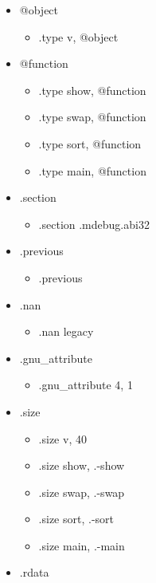 \documentclass[12pt]{article}
\begin{document}
\begin{itemize}
\item @object\\
  \begin{itemize}
  \item .type v, @object
  \end{itemize}
 \item @function\\
  \begin{itemize}
  \item .type show, @function
  \item .type swap, @function
  \item .type sort, @function
  \item .type main, @function
  \end{itemize}
\item .section\\
  \begin{itemize}
  \item .section .mdebug.abi32
  \end{itemize}
\item .previous\\
  \begin{itemize}
  \item .previous
  \end{itemize}
\item .nan\\
  \begin{itemize}
  \item .nan legacy
  \end{itemize}
\item .gnu\_attribute\\
  \begin{itemize}
  \item .gnu\_attribute 4, 1
  \end{itemize}
\item .size\\
  \begin{itemize}
  \item .size v, 40
  \item .size show, .-show
  \item .size swap, .-swap
  \item .size sort, .-sort
  \item .size	main, .-main
  \end{itemize}
\item .rdata\\
  \begin{itemize}

\end{itemize}
\end{itemize}
\end{document}
